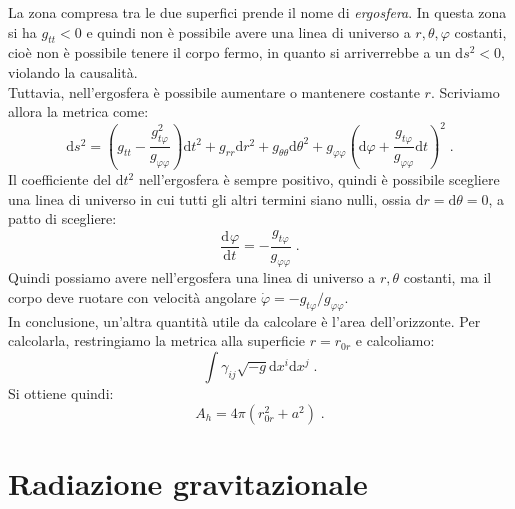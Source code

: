 \documentclass[12pt,a4paper]{report}
\theoremstyle{definition}
\newcommand{\dev}[3][]{\frac{\mathrm{d}^{#1} #2}{\mathrm{d} #3^{#1}}}
\newcommand{\diff}[1][]{\mathrm{d}#1}
\begin{document}
La zona compresa tra le due superfici prende il nome di \emph{ergosfera}. In questa zona si ha $g_{tt}<0$ e quindi non è possibile avere una linea di universo a $r,\theta,\varphi$ costanti, cioè non è possibile tenere il corpo fermo, in quanto si arriverrebbe a un $\diff{s}^2<0$, violando la causalità. \\
Tuttavia, nell'ergosfera è possibile aumentare o mantenere costante $r$. Scriviamo allora la metrica come:
\begin{equation}
\diff{s}^2=\left(g_{tt}-\frac{g_{t\varphi}^2}{g_{\varphi\varphi}}\right)\diff{t}^2+g_{rr}\diff{r}^2+g_{\theta\theta}\diff{\theta}^2+g_{\varphi\varphi}\left(\diff{\varphi}+\frac{g_{t\varphi}}{g_{\varphi\varphi}}\diff{t}\right)^2\;.
\end{equation}
Il coefficiente del $\diff{t}^2$ nell'ergosfera è sempre positivo, quindi è possibile scegliere una linea di universo in cui tutti gli altri termini siano nulli, ossia $\diff{r}=\diff{\theta}=0$, a patto di scegliere:
\begin{equation}
\dev{\varphi}{t}=-\frac{g_{t\varphi}}{g_{\varphi\varphi}}\;.
\end{equation}
Quindi possiamo avere nell'ergosfera una linea di universo a $r,\theta$ costanti, ma il corpo deve ruotare con velocità angolare $\dot{\varphi}=-g_{t\varphi}/g_{\varphi\varphi}$. \\
In conclusione, un'altra quantità utile da calcolare è l'area dell'orizzonte. Per calcolarla, restringiamo la metrica alla superficie $r=r_{0r}$ e calcoliamo:
$$
\int \gamma_{ij}\sqrt{-g}\diff{x^i}\diff{x^j}\;.
$$
Si ottiene quindi:
\begin{equation}
A_h=4\pi(r_{0r}^2+a^2)\;.
\end{equation}
\chapter{Radiazione gravitazionale}
\end{document}
